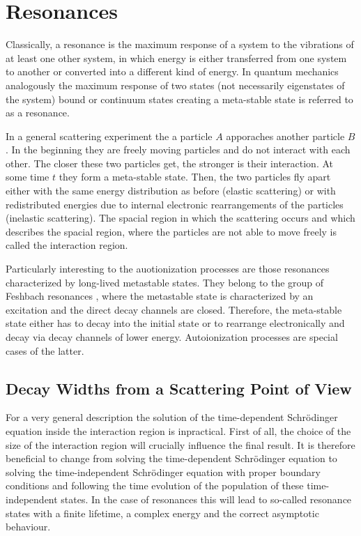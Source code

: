 \chapter{Resonances}

Classically, a resonance is the maximum response of a system to the vibrations
of at least one other
system, in which energy is either transferred from 
one system to another or converted into a different kind of energy.
In quantum mechanics analogously the maximum response 
of two states (not necessarily eigenstates of the system) 
bound or continuum states creating a meta-stable state is referred to as a resonance.

In a general scattering experiment the a particle $A$ apporaches another
particle $B$. In the beginning they are freely moving particles and do not interact
with each other. The closer these two particles get, the stronger is their interaction.
At some time $t$ they form a meta-stable state. Then, the two particles fly apart
either with the same energy distribution as before (elastic scattering) or with
redistributed energies due to internal electronic rearrangements of the particles
(inelastic scattering). The spacial region in which the scattering occurs and
which describes the spacial region, where the particles are not able to move freely is
called the interaction region.

Particularly interesting to the auotionization processes are those resonances
characterized by long-lived metastable states. They belong to the group of Feshbach
resonances \cite{Feshbach58}, where the metastable state is characterized by an
excitation and the direct decay channels are closed. Therefore, the meta-stable
state either has to decay into the initial state or to rearrange electronically
and decay via decay channels of lower energy. Autoionization processes are special
cases of the latter.





\section{Decay Widths from a Scattering Point of View}
For a very general description the solution of the time-dependent Schrödinger
equation inside the interaction region is inpractical. First of all, the
choice of the size of the interaction region will crucially influence the
final result. It is therefore beneficial to change from solving the time-dependent
Schrödinger equation to solving the time-independent Schrödinger equation
with proper boundary conditions and following the time evolution of the population
of these time-independent states. In the case of resonances
this will lead to so-called resonance states
with a finite lifetime, a complex energy and the correct asymptotic behaviour.

